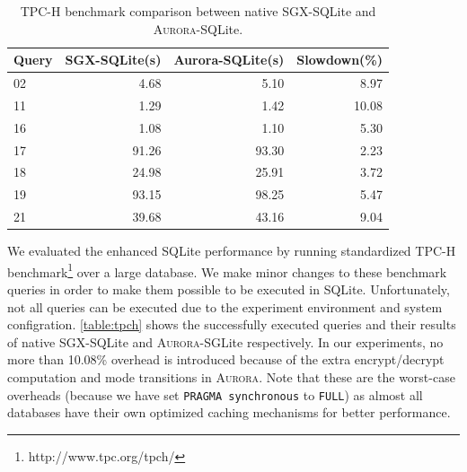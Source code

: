 \begin{table}	
	\centering
	\caption{TPC-H benchmark comparison between native SGX-SQLite and \textsc{Aurora}-SQLite.}
	\label{table:tpch}
	\small
	\begin{tabular}{lrrr}
		\toprule
		\textbf{Query} & \textbf{SGX-SQLite(s)} & \textbf{Aurora-SQLite(s)} & \textbf{Slowdown(\%)} \\
		\midrule
		02 & 4.68 & 5.10 & 8.97 \\
		11 & 1.29 & 1.42 & 10.08 \\
		16 & 1.08 & 1.10 & 5.30 \\
		17 & 91.26 & 93.30 & 2.23 \\
		18 & 24.98 & 25.91 & 3.72 \\
		19 & 93.15 & 98.25 & 5.47 \\
		21 & 39.68 & 43.16 & 9.04 \\
		\bottomrule
	\end{tabular}
\end{table}

We evaluated the enhanced SQLite performance by running standardized TPC-H benchmark\footnote{http://www.tpc.org/tpch/} over a large database. %
We make minor changes to these benchmark queries in order to make them possible to be executed in SQLite. Unfortunately, not all queries can be executed due to the experiment environment and system configration. 
\autoref{table:tpch} shows the successfully executed queries and their results of native SGX-SQLite and \textsc{Aurora}-SGLite respectively. In our experiments, no more than 10.08\% overhead is introduced because of the extra encrypt/decrypt computation and mode transitions in \textsc{Aurora}.
Note that these are the worst-case overheads (because we have set \texttt{PRAGMA synchronous} to \texttt{FULL}) as almost all databases have their own optimized caching mechanisms for better performance.

